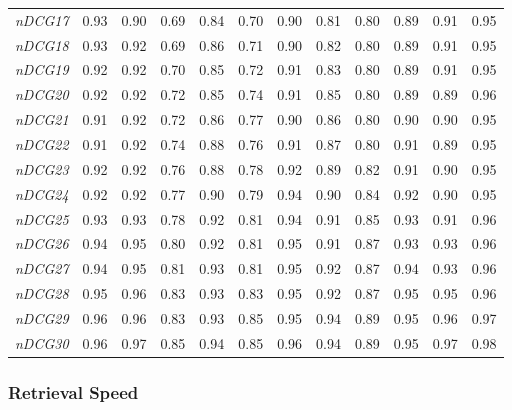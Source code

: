 \begin{table}[h!]
{\begin{tabular}{c||c|c|c|c|c|c|c|c|c|c|c}
\textit{nDCG17} & 0.93 & 0.90 & 0.69 & 0.84 & 0.70 & 0.90 & 0.81 & 0.80 & 0.89 & 0.91 & 0.95 \\ 
\textit{nDCG18} & 0.93 & 0.92 & 0.69 & 0.86 & 0.71 & 0.90 & 0.82 & 0.80 & 0.89 & 0.91 & 0.95 \\ 
\textit{nDCG19} & 0.92 & 0.92 & 0.70 & 0.85 & 0.72 & 0.91 & 0.83 & 0.80 & 0.89 & 0.91 & 0.95 \\ 
\textit{nDCG20} & 0.92 & 0.92 & 0.72 & 0.85 & 0.74 & 0.91 & 0.85 & 0.80 & 0.89 & 0.89 & 0.96 \\ 
\textit{nDCG21} & 0.91 & 0.92 & 0.72 & 0.86 & 0.77 & 0.90 & 0.86 & 0.80 & 0.90 & 0.90 & 0.95 \\ 
\textit{nDCG22} & 0.91 & 0.92 & 0.74 & 0.88 & 0.76 & 0.91 & 0.87 & 0.80 & 0.91 & 0.89 & 0.95 \\ 
\textit{nDCG23} & 0.92 & 0.92 & 0.76 & 0.88 & 0.78 & 0.92 & 0.89 & 0.82 & 0.91 & 0.90 & 0.95 \\ 
\textit{nDCG24} & 0.92 & 0.92 & 0.77 & 0.90 & 0.79 & 0.94 & 0.90 & 0.84 & 0.92 & 0.90 & 0.95 \\ 
\textit{nDCG25} & 0.93 & 0.93 & 0.78 & 0.92 & 0.81 & 0.94 & 0.91 & 0.85 & 0.93 & 0.91 & 0.96 \\ 
\textit{nDCG26} & 0.94 & 0.95 & 0.80 & 0.92 & 0.81 & 0.95 & 0.91 & 0.87 & 0.93 & 0.93 & 0.96 \\ 
\textit{nDCG27} & 0.94 & 0.95 & 0.81 & 0.93 & 0.81 & 0.95 & 0.92 & 0.87 & 0.94 & 0.93 & 0.96 \\ 
\textit{nDCG28} & 0.95 & 0.96 & 0.83 & 0.93 & 0.83 & 0.95 & 0.92 & 0.87 & 0.95 & 0.95 & 0.96 \\ 
\textit{nDCG29} & 0.96 & 0.96 & 0.83 & 0.93 & 0.85 & 0.95 & 0.94 & 0.89 & 0.95 & 0.96 & 0.97 \\ 
\textit{nDCG30} & 0.96 & 0.97 & 0.85 & 0.94 & 0.85 & 0.96 & 0.94 & 0.89 & 0.95 & 0.97 & 0.98 \\ 
\end{tabular}}
\end{table}


\subsubsection{Retrieval Speed}
\\
\\



